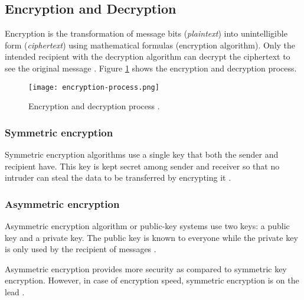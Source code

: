 \subsection{Encryption and Decryption}

Encryption is the transformation of message bits (\textit{plaintext}) into unintelligible form (\textit{ciphertext}) using mathematical formulas (encryption algorithm).
Only the intended recipient with the decryption algorithm can decrypt the ciphertext to see the original message \cite{Devi_2019}.
Figure \ref{fig:encryption-process.png} shows the encryption and decryption process.

\begin{figure}[!ht]
    \centering
    \texttt{[image: encryption-process.png]}
    \caption{Encryption and decryption process \cite{Bhanot_2015}.}
    \label{fig:encryption-process.png}
\end{figure}


\subsubsection{Symmetric encryption}

Symmetric encryption algorithms use a single key that both the sender and recipient have.
This key is kept secret among sender and receiver so that no intruder can steal the data to be transferred by encrypting it  \cite{Bhanot_2015}.


\subsubsection{Asymmetric encryption}

Asymmetric encryption algorithm or public-key systems use two keys: a public key and a private key.
The public key is known to everyone while the private key is only used by the recipient of messages \cite{Bhanot_2015}.

Asymmetric encryption provides more security as compared to symmetric key encryption.
However, in case of encryption speed, symmetric encryption is on the lead \cite{Bhanot_2015}. 